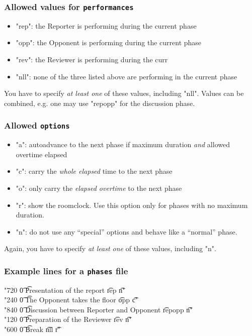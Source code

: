 \documentclass[11pt]{ltxdoc}
\begin{document}
    \subsubsection*{Allowed values for \texttt{performances}}
    \begin{itemize}
        \item "rep": the Reporter is performing during the current phase
        \item "opp": the Opponent is performing during the current phase
        \item "rev": the Reviewer is performing during the curr
        \item "nll": none of the three listed above are performing in the current phase
    \end{itemize}

    You have to specify \textit{at least one} of these values, including "nll". Values can be combined, e.g. one may use "repopp" for the discussion phase.

    \subsubsection*{Allowed \texttt{options}}
    \begin{itemize}
        \item "a": autoadvance to the next phase if maximum duration \textit{and} allowed overtime elapsed
        \item "c": carry the \textit{whole elapsed} time to the next phase
        \item "o": only carry the \textit{elapsed overtime} to the next phase
        \item "r": show the roomclock. Use this option only for phases with no maximum duration.
        \item "n": do not use any \enquote{special} options and behave like a \enquote{normal} phase.
    \end{itemize}

    Again, you have to specify \textit{at least one} of these values, including "n".
    
    
    \subsubsection*{Example lines for a \texttt{phases} file}
    "720  \t 0  \t Presentation of the report                \t rep     \t n" \\
    "240  \t 0  \t The Opponent takes the floor              \t opp     \t c" \\
    "840  \t 0  \t Discussion between Reporter and Opponent  \t repopp  \t n" \\
    "120  \t 0  \t Preparation of the Reviewer               \t rev     \t n" \\
    "600  \t 0  \t Break                                     \t nll     \t r"
    
\end{document}
